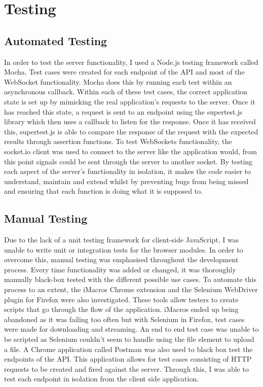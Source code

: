 \documentclass[]{report}
\begin{document}
	\chapter{Testing}
		\section{Automated Testing}
			In order to test the server functionality, I used a Node.js testing framework called Mocha. Test cases were created for each endpoint of the API and most of the WebSocket functionality. Mocha does this by running each test within an asynchronous callback. Within each of these test cases, the correct application state is set up by mimicking the real application's requests to the server. Once it has reached this state, a request is sent to an endpoint using the supertest.js library which then uses a callback to listen for the response. Once it has received this, supertest.js is able to compare the response of the request with the expected results through assertion functions. To test WebSockets functionality, the socket.io client was used to connect to the server like the application would, from this point signals could be sent through the server to another socket. By testing each aspect of the server's functionality in isolation, it makes the code easier to understand, maintain and extend whilst by preventing bugs from being missed and ensuring that each function is doing what it is supposed to.
		
		\section{Manual Testing}
			Due to the lack of a unit testing framework for client-side JavaScript, I was unable to write unit or integration tests for the browser modules. In order to overcome this, manual testing was emphasised throughout the development process. Every time functionality was added or changed, it was thoroughly manually black-box tested with the different possible use cases. To automate this process to an extent, the iMacros Chrome extension and the Selenium WebDriver plugin for Firefox were also investigated. These tools allow testers to create scripts that go through the flow of the application. iMacros ended up being abandoned as it was failing too often but with Selenium in Firefox, test cases were made for downloading and streaming. An end to end test case was unable to be scripted as Selenium couldn't seem to handle using the file element to upload a file. A Chrome application called Postman was also used to black box test the endpoints of the API. This application allows for test cases consisting of HTTP requests to be created and fired against the server. Through this, I was able to test each endpoint in isolation from the client side application. 
		
\end{document}
